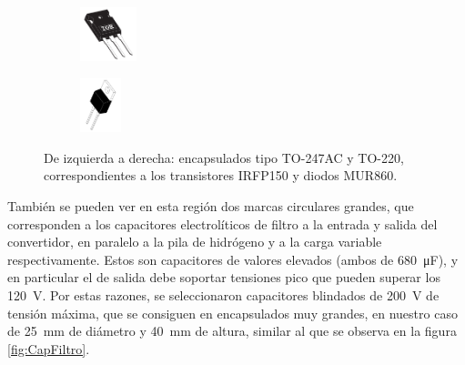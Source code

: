 \begin{figure}[h]
    \centering
    \begin{subfigure}
        \centering
        \includegraphics[width=0.18\textwidth]{Imagenes/IRFP150-TO247AC.png}
    \end{subfigure}
    \hspace{2em}
    \begin{subfigure}
        \centering
        \includegraphics[width=0.13\textwidth]{Imagenes/MUR860.png}
    \end{subfigure}
    \caption{De izquierda a derecha: encapsulados tipo TO-247AC y TO-220, correspondientes a los transistores IRFP150 y diodos MUR860.}
    \label{fig:IRFP150-MUR860}
\end{figure}

También se pueden ver en esta región dos marcas circulares grandes, que corresponden a los capacitores electrolíticos de filtro a la entrada y salida del convertidor, en paralelo a la pila de hidrógeno y a la carga variable respectivamente. Estos son capacitores de valores elevados (ambos de \SI[]{680}[]{\micro\farad}), y en particular el de salida debe soportar tensiones pico que pueden superar los \SI[]{120}[]{\volt}. Por estas razones, se seleccionaron capacitores blindados de \SI[]{200}[]{\volt} de tensión máxima, que se consiguen en encapsulados muy grandes, en nuestro caso de \SI[]{25}[]{\milli\metre} de diámetro y \SI[]{40}[]{\milli\metre} de altura, similar al que se observa en la figura \ref{fig:CapFiltro}.\\


